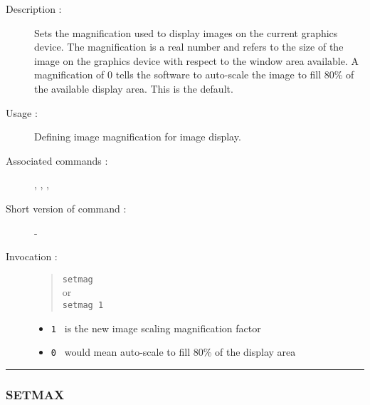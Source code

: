 \begin{description}

\item[Description :] Sets the magnification used to display images on
the current graphics device.  The magnification is a real number and
refers to the size of the image on the graphics device with respect to
the window area available.  A magnification of 0 tells the software to
auto-scale the image to fill 80\% of the available display area.  This
is the default.

\item[Usage :] Defining image magnification for image display.

\item[Associated commands :] {\tt {}}, 
{\tt {}}, {\tt {}}, 
{\tt {}}

\item[Short version of command :] -
\item[Invocation :]

\begin{quote}{\tt  setmag }\\
or \\
{\tt setmag 1 }
\end{quote}

\begin{itemize}

\item {\tt 1 } is the new image scaling magnification factor
\item {\tt 0 } would mean auto-scale to fill 80\% of the display  area
\end{itemize}

\end{description}

\hrule 
\subsubsection*{\label{SETMAX}SETMAX}

